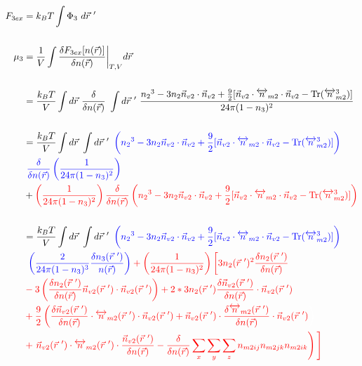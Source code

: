 \documentclass[double,12pt]{revtex4-2}
\begin{document}
\begin{align}
  F_{3ex} &= k_BT\int \Phi_3 ~d\vec r~'  \\ 
  \nonumber\\ 
  \mu_3 &= \frac{1}{V}\int \frac{\delta F_{3ex}[n(\vec r)]}{\delta n(\vec r)}
  \bigg|_{T,V} d\vec r \\ \nonumber \\
%
   &= \frac{k_BT}{V}\int d\vec r~\frac{\delta}{\delta n(\vec r)}~\int 
   d\vec r~'~\frac{{n_2}^3-3n_2\vec{n}_{v2}\cdot\vec{n}_{v2}+\frac{9}{2}
    [\vec{n}_{v2}\cdot{\overleftrightarrow{n}_{m2}}\cdot{\vec{n}_{v2}}
    -\operatorname{Tr}({\overleftrightarrow{n}^3_{m2}})]}{24\pi(1-n_3)^2}
     \nonumber \\ \\
%
     &=\frac{k_BT}{V}\int d\vec r~\int d\vec r~'~ \color{blue}\left( {n_2}^3-3n_2
     \vec{n}_{v2}\cdot\vec{n}_{v2} 
     +\frac{9}{2}[\vec{n}_{v2}\cdot{\overleftrightarrow{n}_{m2}}\cdot{
     \vec{n}_{v2}}-\operatorname{Tr}({\overleftrightarrow{n}^3_{m2}})]
     \right) \nonumber\\
      &~\color{blue} \frac{\delta}{\delta n(\vec r)}\left(\frac{1}{24\pi(1-n_3)^2}
      \right) \nonumber\\
     &+ \color{red}\left(\frac{1}{24\pi(1-n_3)^2}\right)\frac{\delta}
     {\delta n(\vec r)}\left({n_2}^3-3n_2\vec{n}_{v2}\cdot\vec{n}_{v2}
     +\frac{9}{2}[\vec{n}_{v2}\cdot{\overleftrightarrow{n}_{m2}}\cdot{
     \vec{n}_{v2}}-\operatorname{Tr}({\overleftrightarrow{n}^3_{m2}})]
     \right) \\ \nonumber \\
%
    &=\frac{k_BT}{V}\int d\vec r~\int d\vec r~'~\color{blue}\left( {n_2}^3-3n_2
    \vec{n}_{v2}\cdot\vec{n}_{v2} 
     +\frac{9}{2}[\vec{n}_{v2}\cdot{\overleftrightarrow{n}_{m2}}\cdot{
     \vec{n}_{v2}}-\operatorname{Tr}({\overleftrightarrow{n}^3_{m2}})]
     \right) \nonumber\\
     &~\color{blue}\left(\frac{2}{24\pi(1-n_3)^3}\frac{\delta n_3(\vec r~')}{n(\vec r)}
     \right) 
     \color{red}
     + \left(\frac{1}{24\pi(1-n_3)^2}\right)\left[3n_2(\vec r~')^2
     \frac{\delta n_2(\vec r~')}{\delta n(\vec r)} \right.
      \nonumber\\
     &\color{red} - 3\left(\frac{\delta n_{2}(\vec r~')}{\delta n(\vec r)}\vec n_{v2}
     (\vec r~') \cdot \vec n_{v2}(\vec r~')\right) + 2*3n_2(\vec r~')\frac{\delta
     \vec n_{v2}(\vec r~')}{\delta n(\vec r)}\cdot \vec n_{v2}(\vec r~') 
     \nonumber\\
     &\color{red}+\frac{9}{2}\left(\frac{\delta \vec n_{v2}(\vec r~')}{\delta n(\vec r)}
     \cdot \overleftrightarrow n_{m2}(\vec r~')\cdot \vec n_{v2}( \vec r~')
     +\vec n_{v2}(\vec r~')\cdot \frac{\delta \overleftrightarrow n_{m2}
     (\vec r~')}{\delta n(\vec r)}\cdot \vec n_{v2}(\vec r~')\color{white}
     \right)\nonumber\\
     &\color{red}+ \left.\vec n_{v2}(\vec r~')\cdot 
     \overleftrightarrow n_{m2}(\vec r~')
     \cdot \frac{\vec n_{v2}(\vec r~')}{\delta n(\vec r)}-
     \frac{\delta}{\delta n(\vec r)}\sum_x\sum_y\sum_z n_{m2ij}n_{m2jk}
     n_{m2ik}\right)
     \Bigg]
\end{align}
\end{document}

